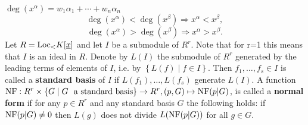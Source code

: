 $\deg(x^\alpha) = w_1 \alpha_1 + \cdots + w_n\alpha_n$
    $$\deg(x^\alpha) < \deg(x^\beta) \Rightarrow x^\alpha < x^\beta,$$
    $$\deg(x^\alpha) > \deg(x^\beta) \Rightarrow x^\alpha > x^\beta. $$
Let $R = \hbox{Loc}_< K[\underline{x}]$ and let $I$ be a submodule of $R^r$.
Note that for r=1 this means that $I$ is an ideal in $R$.
Denote by $L(I)$ the submodule of $R^r$ generated by the leading terms 
of elements of $I$, i.e. by $\left\{L(f) \mid f \in I\right\}$.
Then $f_1, \ldots, f_s \in I$ is called a {\bf standard basis} of $I$ 
if $L(f_1), \ldots, L(f_s)$ generate $L(I)$.
A function $\hbox{NF} : R^r \times \{G \mid G\ \hbox{ a standard
basis}\} \to R^r, (p,G) \mapsto \hbox{NF}(p|G)$, is called a {\bf normal
form} if for any $p \in R^r$ and any standard basis $G$ the following
holds: if $\hbox{NF}(p|G) \not= 0$ then $L(g)$ does not divide
$L(\hbox{NF}(p|G))$ for all $g \in G$.

